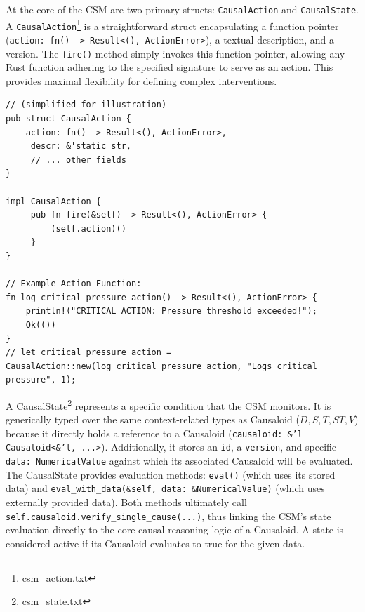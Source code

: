At the core of the CSM are two primary structs: \texttt{CausalAction} and \texttt{CausalState}. A \texttt{CausalAction}\footnote{\url{csm_action.txt}} is a straightforward struct encapsulating a function pointer (\texttt{action: fn() -> Result<(), ActionError>}), a textual description, and a version. The \texttt{fire()} method simply invokes this function pointer, allowing any Rust function adhering to the specified signature to serve as an action. This provides maximal flexibility for defining complex interventions.

\begin{lstlisting}[label={list:csm_action_def}, caption={Conceptual Definition of \texttt{CausalAction} in Rust.}]
// (simplified for illustration)
pub struct CausalAction {
    action: fn() -> Result<(), ActionError>,
     descr: &'static str,
     // ... other fields
}

impl CausalAction {
     pub fn fire(&self) -> Result<(), ActionError> {
         (self.action)()
     }
}

// Example Action Function:
fn log_critical_pressure_action() -> Result<(), ActionError> {
    println!("CRITICAL ACTION: Pressure threshold exceeded!");
    Ok(())
}
// let critical_pressure_action = CausalAction::new(log_critical_pressure_action, "Logs critical pressure", 1);
\end{lstlisting}

A CausalState\footnote{\url{csm_state.txt}} represents a specific condition that the CSM monitors. It is generically typed over the same context-related types as Causaloid ($D, S, T, ST, V$) because it directly holds a reference to a Causaloid (\texttt{causaloid: \&'l Causaloid<\&'l, ...>}). 
Additionally, it stores an \texttt{id}, a \texttt{version}, and specific \texttt{data: NumericalValue} against which its associated Causaloid will be evaluated. The CausalState provides evaluation methods: \texttt{eval()} (which uses its stored data) and \texttt{eval\_with\_data(\&self, data: \&NumericalValue)} (which uses externally provided data). 
Both methods ultimately call \texttt{self.causaloid.verify\_single\_cause(...)}, thus linking the CSM's state evaluation directly to the core causal reasoning logic of a Causaloid. 
A state is considered active if its Causaloid evaluates to true for the given data.


